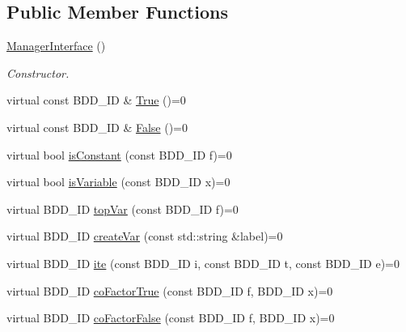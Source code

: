 \subsection*{Public Member Functions}
\begin{DoxyCompactItemize}
\item 
\mbox{\label{classClassProject_1_1ManagerInterface_ae2bf46167e81aa6c912bf8aff4202d17}} 
\hyperlink{classClassProject_1_1ManagerInterface_ae2bf46167e81aa6c912bf8aff4202d17}{Manager\+Interface} ()
\begin{DoxyCompactList}\small\item\em Constructor. \end{DoxyCompactList}\item 
virtual const B\+D\+D\+\_\+\+ID \& \hyperlink{classClassProject_1_1ManagerInterface_a104d0e8bcbd81eb501b66db6e24d1f63}{True} ()=0
\item 
virtual const B\+D\+D\+\_\+\+ID \& \hyperlink{classClassProject_1_1ManagerInterface_a98d18e1bc840fd664af015facfdcf690}{False} ()=0
\item 
virtual bool \hyperlink{classClassProject_1_1ManagerInterface_a0edd879f6ecae7bc5f84a2d55373d977}{is\+Constant} (const B\+D\+D\+\_\+\+ID f)=0
\item 
virtual bool \hyperlink{classClassProject_1_1ManagerInterface_a6eaaec7cbf8826198e490313ccb8f22a}{is\+Variable} (const B\+D\+D\+\_\+\+ID x)=0
\item 
virtual B\+D\+D\+\_\+\+ID \hyperlink{classClassProject_1_1ManagerInterface_ae2c645f859bcc7be3376d478f01eb045}{top\+Var} (const B\+D\+D\+\_\+\+ID f)=0
\item 
virtual B\+D\+D\+\_\+\+ID \hyperlink{classClassProject_1_1ManagerInterface_ab101acd3fbe6a5e29973d88f9862b8b4}{create\+Var} (const std\+::string \&label)=0
\item 
virtual B\+D\+D\+\_\+\+ID \hyperlink{classClassProject_1_1ManagerInterface_a6ea8f9482d86afb4128c52328d9ec11c}{ite} (const B\+D\+D\+\_\+\+ID i, const B\+D\+D\+\_\+\+ID t, const B\+D\+D\+\_\+\+ID e)=0
\item 
virtual B\+D\+D\+\_\+\+ID \hyperlink{classClassProject_1_1ManagerInterface_aab8496a0e551abdad99160e152199f4b}{co\+Factor\+True} (const B\+D\+D\+\_\+\+ID f, B\+D\+D\+\_\+\+ID x)=0
\item 
virtual B\+D\+D\+\_\+\+ID \hyperlink{classClassProject_1_1ManagerInterface_ad749ef1542c5b23bbbce628d6f666fe4}{co\+Factor\+False} (const B\+D\+D\+\_\+\+ID f, B\+D\+D\+\_\+\+ID x)=0

\end{DoxyCompactItemize}
